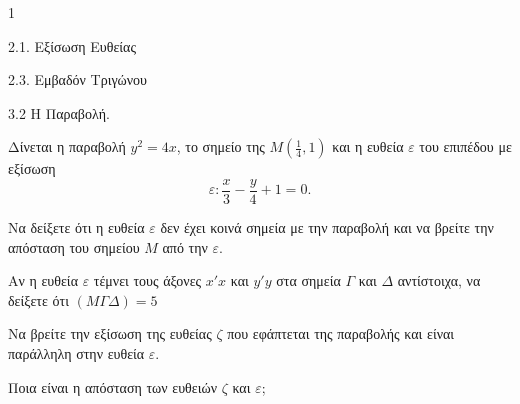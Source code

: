 \begin{ylh}{1}
    \item 2.1. Εξίσωση Ευθείας
    \item 2.3. Εμβαδόν Τριγώνου
    \item 3.2 Η Παραβολή.
\end{ylh}
Δίνεται η παραβολή $y^2 = 4x$, το σημείο της $M\left(\frac{1}{4}, 1\right)$ και η ευθεία $\varepsilon$ του επιπέδου με εξίσωση
\[ \varepsilon: \frac{x}{3} - \frac{y}{4} + 1 = 0. \]
\begin{alist}
\item
    \begin{rlist}
    \item Να δείξετε ότι η ευθεία $\varepsilon$ δεν έχει κοινά σημεία με την παραβολή και να βρείτε την απόσταση του σημείου $M$ από την $\varepsilon$. 
    \item Αν η ευθεία $\varepsilon$ τέμνει τους άξονες $x'x$ και $y'y$ στα σημεία $\Gamma$ και $\Delta$ αντίστοιχα, να δείξετε ότι $(M\Gamma\Delta) = 5$  
    \end{rlist}
\item
    \begin{rlist}
    \item Να βρείτε την εξίσωση της ευθείας $\zeta$ που εφάπτεται της παραβολής και είναι παράλληλη στην ευθεία $\varepsilon$. 
    \item Ποια είναι η απόσταση των ευθειών $\zeta$ και $\varepsilon$; 
    \end{rlist}
\end{alist}